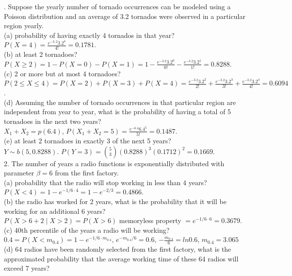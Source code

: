 \documentclass[9pt]{article}
\begin{document}
        . Suppose the yearly number of tornado occurrences can be modeled using a Poisson distribution and an average of 3.2 tornados were observed in a particular region yearly. 
        \\(a) probability of having exactly 4 tornados in that year?\\ $P(X=4) = \frac{e^{-3,2}3.2^4}{4!} = 0.1781$. 
        \\(b) at least 2 tornadoes? \\$P(X\geq 2)=1-P(X=0)-P(X=1)=1-\frac{e^{-3.2}3.2^{0}}{0!}-\frac{e^{-3.2}3.2^1}{1!} = 0.8288$.
        \\(c) 2 or more but at most 4 tornadoes?\\ $P(2\leq X\leq 4) = P(X=2)+P(X=3)+P(X=4) = \frac{e^{-3.2}3.2^2}{2!}+\frac{e^{-3.2}3.2^3}{3!}+\frac{e^{-3.2}3.2^4}{4!} = 0.6094$.
        \\(d) Assuming the number of tornado occurrences in that particular region are independent from year to year, what is the probability of having a total of 5 tornadoes in the next two years?
        \\$X_1 + X_2 = p(6.4)$, $P(X_1+X_2 = 5) = \frac{e^{-6.4}6.4^5}{5!} = 0.1487$.
        \\(e) at least 2 tornadoes in exactly 3 of the next 5 years? \\$Y\sim b(5,0.8288)$. $P(Y=3)=\binom{5}{3}(0.8288)^3(0.1712)^2 = 0.1669$.\\
        2. The number of years a radio functions is exponentially distributed with parameter $\beta=6$ from the first factory.
        \\(a) probability that the radio will stop working in less than 4 years? \\$P(X<4)=1-e^{-1/6\cdot 4} = 1-e^{-2/3}=0.4866$.
        \\(b) the radio has worked for 2 years, what is the probability that it will be working for an additional 6 years?
        \\$P(X>6+2 \mid X>2) = P(X>6)$ memoryless property $ = e^{-1/6\cdot 6} = 0.3679$. 
        \\(c) 40th percentile of the years a radio will be working?\\ $0.4=P(X<m_{0.4}) = 1-e^{-1/6\cdot m_{0.4}}$, $e^{-m_{0.4}/6}=0.6$, $-\frac{m_{0.4}}{6}=ln0.6$, $m_{0.4}=3.065$
        \\(d) 64 radios have been randomly selected from the first factory, what is the approximated probability that the average working time of these 64 radios will exceed 7 years?
\end{document}
